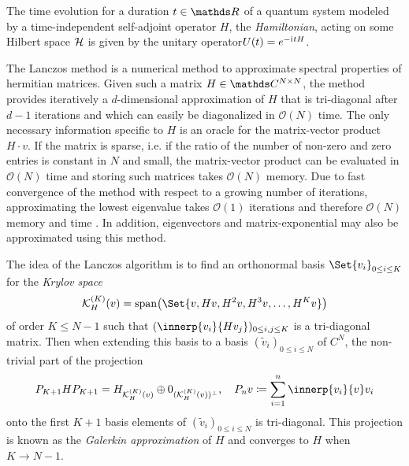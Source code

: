 The time evolution for a duration \(t\in\R\) of a quantum system modeled by a time-independent self-adjoint operator \(H\), the \emph{Hamiltonian}, acting on some Hilbert space \(\mathcal{H}\) is given by the unitary operator\footnotemark \(U(t) = e^{-\mathrm{i}\mkern1mu t H}\).


The Lanczos method is a numerical method to approximate spectral properties of hermitian matrices. 
Given such a matrix \(H \in \C^{N\times N}\), the method provides iteratively a \(d\)-dimensional approximation of \(H\) that is tri-diagonal after \(d-1\) iterations and which can easily be diagonalized in \(\mathcal{O}(N)\) time.
The only necessary information specific to \(H\) is an oracle for the matrix-vector product \(H\cdot v\).
If the matrix is sparse, i.e. if the ratio of the number of non-zero and zero entries is constant in \(N\) and small, the matrix-vector product can be evaluated in \(\mathcal{O}(N)\) time and storing such matrices takes \(\mathcal{O}(N)\) memory. 
Due to fast convergence of the method with respect to a growing number of iterations, approximating the lowest eigenvalue takes \(\mathcal{O}(1)\) iterations and therefore \(\mathcal{O}(N)\) memory and time \cite{kocherikLanczosMethod2015}.
In addition, eigenvectors and matrix-exponential may also be approximated using this method. 

The idea of the Lanczos algorithm is to find an orthonormal basis \(\Set{v_i}_{0\leq i \leq K}\) for the \emph{Krylov space}
\begin{equation}
    \mathcal{K}^{(K)}_H(v) = \vecspan\of*{\Set{v, Hv, H^2v, H^3v, \dots, H^K v}}
\end{equation}
of order \(K \leq N-1\) such that \((\innerp{v_i}{H v_j})_{0 \leq i,j \leq K}\) is a tri-diagonal matrix. 
Then when extending this basis to a basis \((\tilde v_i)_{0\leq i \leq N}\) of \(C^N\), the non-trivial part of the projection 
\begin{equation}
    P_{K+1} H P_{K+1} = H_{\mathcal{K}^{(K)}_H(v)} \oplus 0_{(\mathcal{K}^{(K)}_H(v))^\perp}, \quad P_n v \coloneq \sum_{i=1}^n \innerp{v_i}{v} v_i
\end{equation}
onto the first \(K+1\) basis elements of \((\tilde{v}_i)_{0\leq i \leq N}\) is tri-diagonal. 
This projection is known as the \emph{Galerkin approximation} of \(H\) and converges to \(H\) when \(K \to N-1\).

